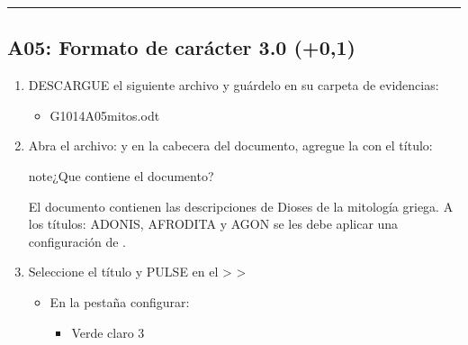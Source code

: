 \documentclass[letterpaper,10pt,spanish]{sphinxmanual}
\begin{document}
\bigskip\hrule\bigskip



\subsection{A05: Formato de carácter 3.0  (+0,1)}
\label{\detokenize{1_guias/10ofimatica/G1014:a05-formato-de-caracter-3-0-101-0-1}}
\sphinxAtStartPar
{}
\begin{enumerate}
%
\item {} 
\sphinxAtStartPar
DESCARGUE el siguiente archivo y guárdelo en su carpeta de evidencias:
\begin{itemize}
\item {} 
\sphinxAtStartPar
G1014A05\sphinxhyphen{}mitos.odt 

\end{itemize}

\item {} 
\sphinxAtStartPar
Abra el archivo:  y en la cabecera del documento, agregue la  con el título: 

\begin{sphinxadmonition}{note}{¿Que contiene el documento?}

\sphinxAtStartPar
El documento contienen las descripciones de Dioses de la mitología griega. A los títulos: ADONIS, AFRODITA y AGON se les debe aplicar una configuración de .
\end{sphinxadmonition}

\item {} 
\sphinxAtStartPar
Seleccione el título  y PULSE en el  >  > 
\begin{itemize}
\item {} 
\sphinxAtStartPar
En la pestaña  configurar:
\begin{itemize}
\item {} 
\sphinxAtStartPar
{} Verde claro 3


\end{itemize}
\end{itemize}
\end{enumerate}
\end{document}
